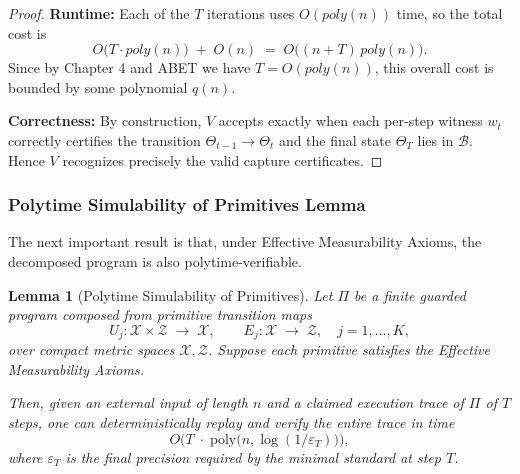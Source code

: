 \documentclass[12pt]{article}
\theoremstyle{definition}
\theoremstyle{plain}
\newtheorem{lemma}{Lemma}[section]
\begin{document}
\begin{proof}
\medskip\noindent\textbf{Runtime:}  Each of the \(T\) iterations uses \(O(poly(n))\) time, so the total cost is
\[
  O\bigl(T\cdot poly(n)\bigr) \;+\; O(n)
  \;=\;
  O\bigl((n+T)\,poly(n)\bigr).
\]
Since by Chapter 4 and ABET we have \(T = O(poly(n))\), this overall cost is bounded by some polynomial \(q(n)\).

\medskip\noindent\textbf{Correctness:}  By construction, \(V\) accepts exactly when each per‑step witness \(w_t\) correctly certifies the transition \(\Theta_{t-1}\to\Theta_t\) and the final state \(\Theta_T\) lies in \(\mathcal B\).  Hence \(V\) recognizes precisely the valid capture certificates.
\end{proof}

\subsubsection{Polytime Simulability of Primitives Lemma}
The next important result is that, under Effective Measurability Axioms, the decomposed program is also polytime-verifiable.

\begin{lemma}[Polytime Simulability of Primitives]
\label{lem:pt-simulability}
Let \(\Pi\) be a finite guarded program composed from primitive transition maps
\[
  U_j : \mathcal X \times \mathcal Z \;\to\;\mathcal X,
  \qquad
  E_j : \mathcal X \;\to\;\mathcal Z,
  \quad
  j = 1,\dots,K,
\]
over compact metric spaces \(\mathcal X,\mathcal Z\).  Suppose each primitive satisfies the Effective Measurability Axioms.


Then, given an external input of length \(n\) and a claimed execution trace of \(\Pi\) of \(T\) steps,
one can \emph{deterministically replay and verify} the entire trace in time
\[
  O\!\bigl(T\;\cdot\;\mathrm{poly}\bigl(n,\log(1/\varepsilon_T)\bigr)\bigr),
\]
where \(\varepsilon_T\) is the final precision required by the minimal standard at step \(T\).\end{lemma}
\end{document}
